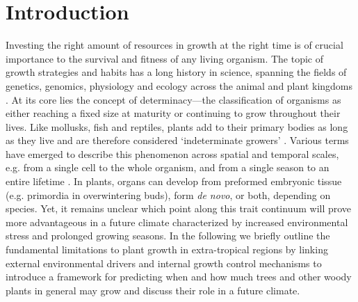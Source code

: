 \documentclass{article}
\begin{document}
\section*{Introduction}
		Investing the right amount of resources in growth at the right time is of crucial importance to the survival and fitness of any living organism. The topic of growth strategies and habits has a long history in science, spanning the fields of genetics, genomics, physiology and ecology across the animal and plant kingdoms \citep{stearnsEvolutionLifeHistories1998a}. At its core lies the concept of determinacy—the classification of organisms as either reaching a fixed size at maturity or continuing to grow throughout their lives. Like mollusks, fish and reptiles, plants add to their primary bodies as long as they live and are therefore considered ‘indeterminate growers’  \citep{ejsmondHowTimeGrowth2010}. Various terms have emerged to describe this phenomenon across spatial and temporal scales, e.g. from a single cell to the whole organism, and from a single season to an entire lifetime \citep{mcdanielInductionDeterminationDevelopmental1992a, karkachTrajectoriesModelsIndividual2006}. In plants, organs can develop from preformed embryonic tissue (e.g. primordia in overwintering buds), form \textit{de novo}, or both, depending on species. Yet, it remains unclear which point along this trait continuum will prove more advantageous in a future climate characterized by increased environmental stress and prolonged growing seasons. In the following we briefly outline the fundamental limitations to plant growth in extra-tropical regions by linking external environmental drivers and internal growth control mechanisms to introduce a framework for predicting when and how much trees and other woody plants in general may grow and discuss their role in a future climate. \\
		
\end{document}
